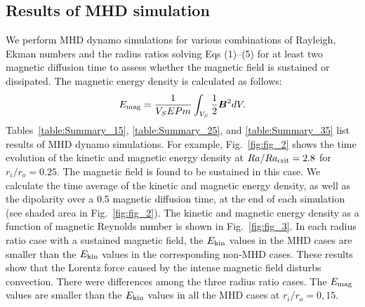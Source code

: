\subsection{Results of MHD simulation}

{\color{red}
We perform MHD dynamo simulations for various combinations of Rayleigh, Ekman numbers and the radius ratios solving Eqs (1)--(5) for at least two magnetic diffusion time to assess whether the magnetic field is sustained or dissipated.
}
The magnetic energy density is calculated as follows:
%
\begin{equation}
E_{\rm mag} = \frac{1}{V_{S}E Pm} \int_{V_{S}} \frac{1}{2} \mbox{\boldmath$B$}^{2} dV.
\label{eq:magnetic_energy}
\end{equation}
%
Tables~\ref{table:Summary_15}, \ref{table:Summary_25}, and \ref{table:Summary_35} list results of MHD dynamo simulations. 
For example, Fig.~\ref{fig:fig_2} shows the time evolution of the kinetic and magnetic energy density at $Ra/Ra_{\rm crit} = 2.8$ for $r_i/r_o = 0.25$. 
The magnetic field is found to be sustained in this case. 
We calculate the time average of the kinetic and magnetic energy density, as well as the dipolarity over a 0.5 magnetic diffusion time, at the end of each simulation (see shaded area in Fig.~\ref{fig:fig_2}).
{\color{red} %
The kinetic and magnetic energy density as a function of magnetic Reynolds number is shown in Fig.~\ref{fig:fig_3}.
}
In each radius ratio case with a sustained magnetic field, the $E_{\rm kin}$ values in the MHD cases are smaller than the $E_{\rm kin}$ values in the corresponding non-MHD cases. 
These results show that the Lorentz force caused by the intense magnetic field disturbs convection.
There were differences among the three radius ratio cases. 
{\color{red} %
The $E_{\rm mag}$ values are smaller than the $E_{\rm kin}$ values in all the MHD cases at $r_i / r_o = 0,15$.
}
